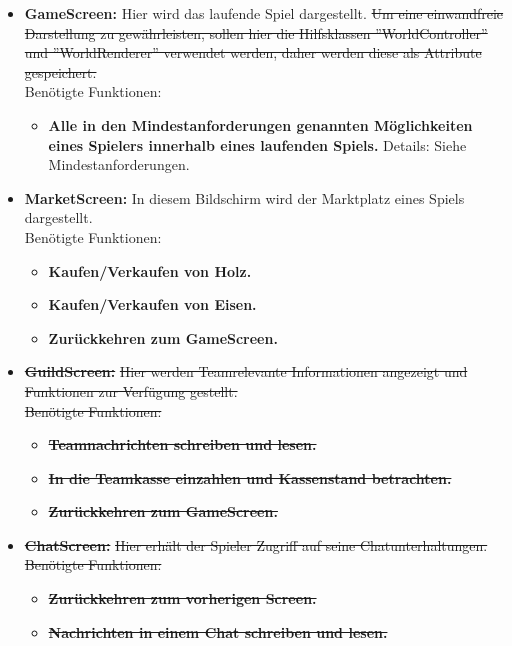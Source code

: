 \documentclass[fontsize=12pt,paper=a4,twoside]{scrartcl}
\begin{document}
\begin{itemize}
\item \textbf{GameScreen:}
Hier wird das laufende Spiel dargestellt. \sout{Um eine einwandfreie Darstellung zu gewährleisten, sollen hier die Hilfsklassen ''WorldController'' und ''WorldRenderer'' verwendet werden, daher werden diese als Attribute gespeichert.}\\ Benötigte Funktionen:
\begin{itemize}
	\item \textbf{Alle in den Mindestanforderungen genannten Möglichkeiten eines Spielers innerhalb eines laufenden Spiels.} Details: Siehe Mindestanforderungen.
\end{itemize}

\item \textbf{MarketScreen:}
In diesem Bildschirm wird der Marktplatz eines Spiels dargestellt.\\ Benötigte Funktionen:
\begin{itemize}
	\item \textbf{Kaufen/Verkaufen von Holz.}
	\item \textbf{Kaufen/Verkaufen von Eisen.}
	\item \textbf{Zurückkehren zum GameScreen.}
\end{itemize}

\item \textbf{\sout{GuildScreen:}}
\sout{Hier werden Teamrelevante Informationen angezeigt und Funktionen zur Verfügung gestellt.\\ Benötigte Funktionen:}
\begin{itemize}
	\item \textbf{\sout{Teamnachrichten schreiben und lesen.}}
	\item \textbf{\sout{In die Teamkasse einzahlen und Kassenstand betrachten.}}
	\item \textbf{\sout{Zurückkehren zum GameScreen.}}
\end{itemize}

\item \textbf{\sout{ChatScreen:}}
\sout{Hier erhält der Spieler Zugriff auf seine Chatunterhaltungen.\\ Benötigte Funktionen:}
\begin{itemize}
	\item \textbf{\sout{Zurückkehren zum vorherigen Screen.}}
	\item \textbf{\sout{Nachrichten in einem Chat schreiben und lesen.}}
\end{itemize}
\end{itemize}
\end{document}
